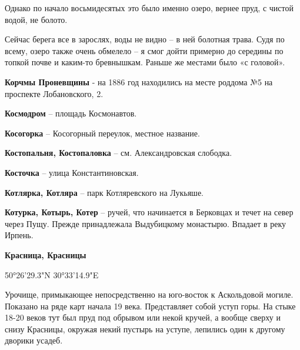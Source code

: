 Однако по начало восьмидесятых это было именно озеро, вернее пруд, с чистой водой, не болото.

Сейчас берега все в зарослях, воды не видно – в ней болотная трава. Судя по всему, озеро также очень обмелело – я смог дойти примерно до середины по топкой почве и каким-то бревнышкам. Раньше же местами было «с головой».\\

\medskip

\textbf{Корчмы Проневщины} - на 1886 год находились на месте роддома №5 на проспекте Лобановского, 2.\\

\medskip


\textbf{Космодром} – площадь Космонавтов.\\

\medskip

\textbf{Косогорка} – Косогорный переулок, местное название.\\

\medskip

\textbf{Костопальня, Костопаловка} – см.  Александровская слободка.\\

\medskip

\textbf{Косточка} – улица Константиновская.\\

\medskip



\textbf{Котлярка, Котляра} – парк Котляревского на Лукьяше.\\

\medskip

\textbf{Котурка, Котырь, Котер} – ручей, что начинается в Берковцах и течет на север через Пущу. Прежде принадлежала Выдубицкому монастырю. Впадает в реку Ирпень.\\

\medskip

\textbf{Красница, Красницы} 

50°26'29.3"N 30°33'14.9"E

Урочище, примыкающее непосредственно на юго-восток к Аскольдовой могиле. Показано на ряде карт начала 19 века. Представляет собой уступ горы. На стыке 18-20 веков тут был пруд под обрывом или некой кручей, а вообще сверху и снизу Красницы, окружая некий пустырь на уступе, лепились один к другому дворики усадеб.

